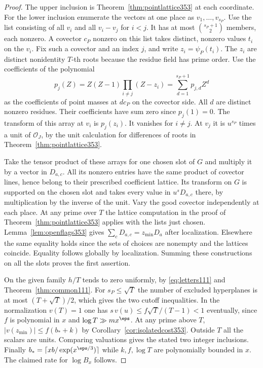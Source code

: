 \documentclass[a4paper,11pt]{article}
\theoremstyle{definition}
\theoremstyle{remark}
\numberwithin{equation}{section}
\begin{document}
\begin{proof}
The upper inclusion is Theorem~\ref{thm:pointlattice353} at
each coordinate. For the lower inclusion enumerate the vectors
at one place as \(v_1,\ldots,v_{s_P}\). Use the list consisting
of all \(v_i\) and all \(v_i-v_j\) for \(i<j\). It has at most
\(\binom{s_P+1}{2}\) members, each nonzero. A covector \(c_P\)
nonzero on this list takes distinct, nonzero values \(t_i\) on
the \(v_i\). Fix such a covector and an index \(j\), and write
\(z_i=\psi_P(t_i)\). The \(z_i\) are distinct nonidentity
\(T\)-th roots because the residue field has prime order. Use
the coefficients of the polynomial
\[
       p_j(Z)=Z(Z-1)\prod_{i\ne j}(Z-z_i)
                  =\sum_{d=1}^{s_P+1}p_{j,d} Z^d
\]
as the coefficients of point masses at \(d c_P\) on the
covector side. All \(d\) are distinct nonzero residues. Their
coefficients have sum zero since \(p_j(1)=0\). The transform
of this array at \(v_i\) is \(p_j(z_i)\). It vanishes for
\(i\ne j\). At \(v_j\) it is \(u^{s_P}\) times a unit of
\(\mathcal O_J\), by the unit calculation for differences of
roots in Theorem~\ref{thm:pointlattice353}.

Take the tensor product of these arrays for one chosen slot of
\(G\) and multiply it by a vector in \(D_{a,c}\). All its
nonzero entries have the same product of covector lines, hence
belong to their prescribed coefficient lattice. Its transform
on \(G\) is supported on the chosen slot and takes every value
in \(u^s D_{a,c}\) there, by multiplication by the inverse
of the unit. Vary the good covector independently at each place.
At any prime over \(T\) the lattice computation in the proof of
Theorem~\ref{thm:pointlattice353} applies with the lists just
chosen. Lemma~\ref{lem:openflags353} gives
\(\sum_c D_{a,c}=z_{\min}D_a\) after localization. Elsewhere
the same equality holds since the sets of choices are nonempty
and the lattices coincide. Equality follows globally by
localization. Summing these constructions on all the slots proves
the first assertion.

On the given family \(h/T\) tends to zero uniformly, by
\eqref{eq:letters111} and Theorem~\ref{thm:common111}. For
\(s_P\le\sqrt T\) the number of excluded hyperplanes is at
most \((T+\sqrt T)/2\), which gives the two cutoff inequalities.
In the normalization \(v(T)=1\) one has
\(s\,v(u)\le f\sqrt T/(T-1)<1\) eventually, since \(f\) is
polynomial in \(x\) and \(\log T\gg m x^\eps\). At any prime
above \(T\), \(|v(z_{\min})|\le f(b_*+k)\) by
Corollary~\ref{cor:isolatedcost353}. Outside \(T\) all the
scalars are units. Comparing valuations gives the stated two
integer inclusions. Finally \(b_*=\lceil xb/\exp(x^{\eps/3})\rceil\)
while \(k,f,\log T\) are polynomially bounded in \(x\). The
claimed rate for \(\log B_x\) follows.
\end{proof}
\end{document}
